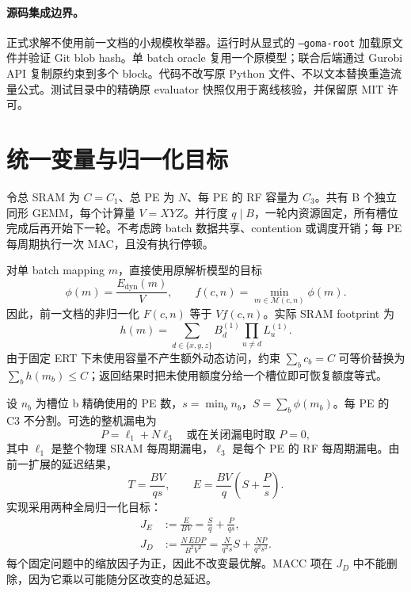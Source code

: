 \documentclass[UTF8,11pt,a4paper,fontset=fandol]{ctexart}
\theoremstyle{remark}\newtheorem{remark}[proposition]{说明}
\numberwithin{equation}{section}
\begin{document}
\paragraph{源码集成边界。}
正式求解不使用前一文档的小规模枚举器。运行时从显式的 \texttt{--goma-root} 加载原文件并验证 Git blob hash。单 batch oracle 复用一个原模型；联合后端通过 Gurobi API 复制原约束到多个 block。代码不改写原 Python 文件、不以文本替换重造流量公式。测试目录中的精确原 evaluator 快照仅用于离线核验，并保留原 MIT 许可。

\section{统一变量与归一化目标}
\label{sec:objective}
令总 SRAM 为 $C=C_1$、总 PE 为 $N$、每 PE 的 RF 容量为 $C_3$。共有 B 个独立同形 GEMM，每个计算量 $V=XYZ$。并行度 $q\mid B$，一轮内资源固定，所有槽位完成后再开始下一轮。不考虑跨 batch 数据共享、contention 或调度开销；每 PE 每周期执行一次 MAC，且没有执行停顿。

对单 batch mapping $m$，直接使用原解析模型的目标
\begin{equation}
\phi(m)=\frac{E_{\mathrm{dyn}}(m)}{V},\qquad
f(c,n)=\min_{m\in\mathcal M(c,n)}\phi(m).
\label{eq:phi}
\end{equation}
因此，前一文档的非归一化 $F(c,n)$ 等于 $Vf(c,n)$。实际 SRAM footprint 为
\begin{equation}
h(m)=\sum_{d\in\{x,y,z\}} B_d^{(1)}\prod_{u\ne d}L_u^{(1)}.
\end{equation}
由于固定 ERT 下未使用容量不产生额外动态访问，约束 $\sum_b c_b=C$ 可等价替换为 $\sum_b h(m_b)\le C$；返回结果时把未使用额度分给一个槽位即可恢复额度等式\cite{batch}。

设 $n_b$ 为槽位 b 精确使用的 PE 数，$s=\min_b n_b$，$S=\sum_b\phi(m_b)$。每 PE 的 C3 不分割。可选的整机漏电为
\begin{equation}
P=\ell_1+N\ell_3\quad\text{或在关闭漏电时取 }P=0,
\end{equation}
其中 $\ell_1$ 是整个物理 SRAM 每周期漏电，$\ell_3$ 是每个 PE 的 RF 每周期漏电。由前一扩展的延迟结果\cite{batch}，
\begin{equation}
T=\frac{BV}{qs},\qquad
E=\frac{BV}{q}\left(S+\frac{P}{s}\right).
\label{eq:physical}
\end{equation}
实现采用两种全局归一化目标：
\begin{align}
J_E&:=\frac{E}{BV}=\frac{S}{q}+\frac{P}{qs},\label{eq:JE}\\
J_D&:=\frac{N\,EDP}{B^2V^2}
=\frac{N}{q^2s}S+\frac{NP}{q^2s^2}.
\label{eq:JD}
\end{align}
每个固定问题中的缩放因子为正，因此不改变最优解。MACC 项在 $J_D$ 中不能删除，因为它乘以可能随分区改变的总延迟。
\end{document}
